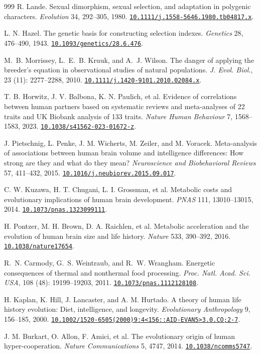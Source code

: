 \documentclass[10pt,twocolumn,letterpaper]{article}
\newcommand{\doi}[1]{\href{https://doi.org/#1}{\nolinkurl{#1}}}
\begin{document}
\begin{thebibliography}{999}
 R. Lande. Sexual dimorphism, sexual selection, and adaptation in polygenic characters. \emph{Evolution} 34, 292--305, 1980. \doi{10.1111/j.1558-5646.1980.tb04817.x}.

 L. N. Hazel. The genetic basis for constructing selection indexes. \emph{Genetics} 28, 476--490, 1943. \doi{10.1093/genetics/28.6.476}.

 M.~B. {Morrissey}, L.~E.~B. {Kruuk}, and A.~J. {Wilson}. {The danger of applying the breeder's equation in observational studies of natural populations}. \emph{J. Evol. Biol.}, 23 (11): 2277--2288, 2010. \doi{10.1111/j.1420-9101.2010.02084.x}.

 T. B. Horwitz, J. V. Balbona, K. N. Paulich, et al. Evidence of correlations between human partners based on systematic reviews and meta-analyses of 22 traits and UK Biobank analysis of 133 traits. \emph{Nature Human Behaviour} 7, 1568--1583, 2023. \doi{10.1038/s41562-023-01672-z}.

 J. Pietschnig, L. Penke, J. M. Wicherts, M. Zeiler, and M. Voracek. Meta-analysis of associations between human brain volume and intelligence differences: How strong are they and what do they mean? \emph{Neuroscience and Biobehavioral Reviews} 57, 411--432, 2015. \doi{10.1016/j.neubiorev.2015.09.017}.

 C. W. Kuzawa, H. T. Chugani, L. I. Grossman, et al. Metabolic costs and evolutionary implications of human brain development. \emph{PNAS} 111, 13010--13015, 2014. \doi{10.1073/pnas.1323099111}.

 H. Pontzer, M. H. Brown, D. A. Raichlen, et al. Metabolic acceleration and the evolution of human brain size and life history. \emph{Nature} 533, 390--392, 2016. \doi{10.1038/nature17654}.

 R.~N. {Carmody}, G.~S. {Weintraub}, and R.~W. {Wrangham}. {Energetic consequences of thermal and nonthermal food processing}. \emph{Proc. Natl. Acad. Sci. USA}, 108 (48): 19199--19203, 2011. \doi{10.1073/pnas.1112128108}.

 H. Kaplan, K. Hill, J. Lancaster, and A. M. Hurtado. A theory of human life history evolution: Diet, intelligence, and longevity. \emph{Evolutionary Anthropology} 9, 156--185, 2000. \doi{10.1002/1520-6505(2000)9:4<156::AID-EVAN5>3.0.CO;2-7}.

 J. M. Burkart, O. Allon, F. Amici, et al. The evolutionary origin of human hyper-cooperation. \emph{Nature Communications} 5, 4747, 2014. \doi{10.1038/ncomms5747}.


\end{thebibliography}
\end{document}
